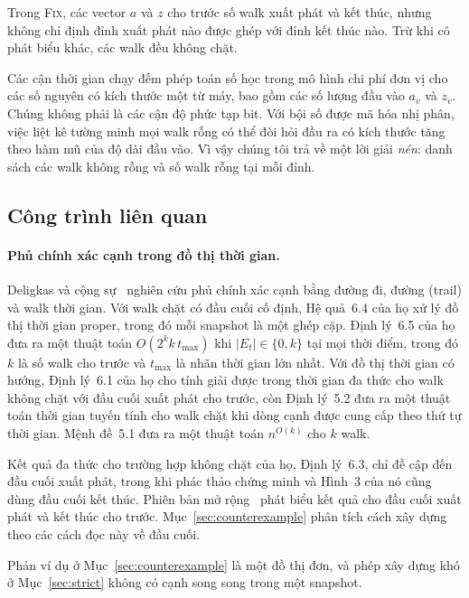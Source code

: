 \documentclass[pdflatex,sn-mathphys-num]{sn-jnl}
\theoremstyle{thmstyleone}%
\theoremstyle{thmstyletwo}%
\theoremstyle{thmstylethree}%
\newcommand{\FIX}{\textup{\textsc{Fix}}}
\newcommand{\abs}[1]{\lvert #1\rvert}
\begin{document}
Trong \FIX{}, các vector $a$ và $z$ cho trước số walk xuất phát và kết thúc, nhưng không chỉ định đỉnh xuất phát nào được ghép với đỉnh kết thúc nào. Trừ khi có phát biểu khác, các walk đều không chặt.

Các cận thời gian chạy đếm phép toán số học trong mô hình chi phí đơn vị cho các số nguyên có kích thước một từ máy, bao gồm các số lượng đầu vào $a_v$ và $z_v$. Chúng không phải là các cận độ phức tạp bit. Với bội số được mã hóa nhị phân, việc liệt kê tường minh mọi walk rỗng có thể đòi hỏi đầu ra có kích thước tăng theo hàm mũ của độ dài đầu vào. Vì vậy chúng tôi trả về một lời giải \emph{nén}: danh sách các walk không rỗng và số walk rỗng tại mỗi đỉnh.

\subsection{Công trình liên quan}\label{sec:related}

\paragraph{Phủ chính xác cạnh trong đồ thị thời gian.}
Deligkas và cộng sự~\cite{deligkas2025} nghiên cứu phủ chính xác cạnh bằng đường đi, đường (trail) và walk thời gian. Với walk chặt có đầu cuối cố định, Hệ quả~6.4 của họ xử lý đồ thị thời gian proper, trong đó mỗi snapshot là một ghép cặp. Định lý~6.5 của họ đưa ra một thuật toán $O(2^k k\,t_{\max})$ khi $\abs{E_t}\in\{0,k\}$ tại mọi thời điểm, trong đó $k$ là số walk cho trước và $t_{\max}$ là nhãn thời gian lớn nhất. Với đồ thị thời gian có hướng, Định lý~6.1 của họ cho tính giải được trong thời gian đa thức cho walk không chặt với đầu cuối xuất phát cho trước, còn Định lý~5.2 đưa ra một thuật toán thời gian tuyến tính cho walk chặt khi dòng cạnh được cung cấp theo thứ tự thời gian. Mệnh đề~5.1 đưa ra một thuật toán $n^{O(k)}$ cho $k$ walk.

Kết quả đa thức cho trường hợp không chặt của họ, Định lý~6.3, chỉ đề cập đến đầu cuối xuất phát, trong khi phác thảo chứng minh và Hình~3 của nó cũng dùng đầu cuối kết thúc. Phiên bản mở rộng~\cite{deligkas2024arxiv} phát biểu kết quả cho đầu cuối xuất phát và kết thúc cho trước. Mục~\ref{sec:counterexample} phân tích cách xây dựng theo các cách đọc này về đầu cuối.

Phản ví dụ ở Mục~\ref{sec:counterexample} là một đồ thị đơn, và phép xây dựng khó ở Mục~\ref{sec:strict} không có cạnh song song trong một snapshot.
\end{document}
